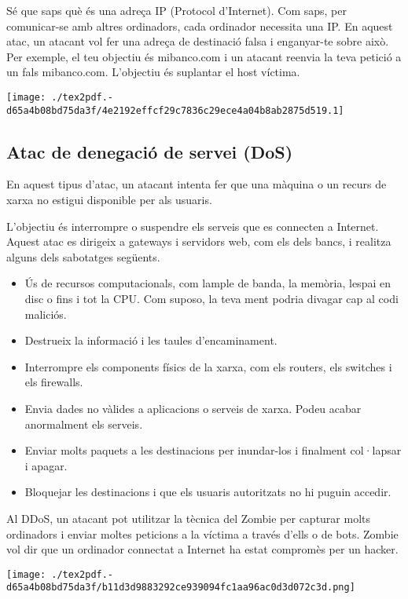 \documentclass[]{article}
\begin{document}
Sé que saps què és una adreça IP (Protocol d'Internet). Com saps, per
comunicar-se amb altres ordinadors, cada ordinador necessita una IP. En
aquest atac, un atacant vol fer una adreça de destinació falsa i
enganyar-te sobre això. Per exemple, el teu objectiu és mibanco.com i un
atacant reenvia la teva petició a un fals mibanco.com. L'objectiu és
suplantar el host víctima.

\texttt{[image: ./tex2pdf.-d65a4b08bd75da3f/4e2192effcf29c7836c29ece4a04b8ab2875d519.1]}

\hypertarget{atac-de-denegaciuxf3-de-servei-dos}{%
\subsection{Atac de denegació de servei
(DoS)}\label{atac-de-denegaciuxf3-de-servei-dos}}

En aquest tipus d'atac, un atacant intenta fer que una màquina o un
recurs de xarxa no estigui disponible per als usuaris.

L'objectiu és interrompre o suspendre els serveis que es connecten a
Internet. Aquest atac es dirigeix ​​a gateways i servidors web, com els
dels bancs, i realitza alguns dels sabotatges següents.

\begin{itemize}
\item
  Ús de recursos computacionals, com lample de banda, la memòria, lespai
  en disc o fins i tot la CPU. Com suposo, la teva ment podria divagar
  cap al codi maliciós.
\item
  Destrueix la informació i les taules d'encaminament.
\item
  Interrompre els components físics de la xarxa, com els routers, els
  switches i els firewalls.
\item
  Envia dades no vàlides a aplicacions o serveis de xarxa. Podeu acabar
  anormalment els serveis.
\item
  Enviar molts paquets a les destinacions per inundar-los i finalment
  col·lapsar i apagar.
\item
  Bloquejar les destinacions i que els usuaris autoritzats no hi puguin
  accedir.
\end{itemize}

Al DDoS, un atacant pot utilitzar la tècnica del Zombie per capturar
molts ordinadors i enviar moltes peticions a la víctima a través d'ells
o de bots. Zombie vol dir que un ordinador connectat a Internet ha estat
compromès per un hacker.

\texttt{[image: ./tex2pdf.-d65a4b08bd75da3f/b11d3d9883292ce939094fc1aa96ac0d3d072c3d.png]}
\end{document}
